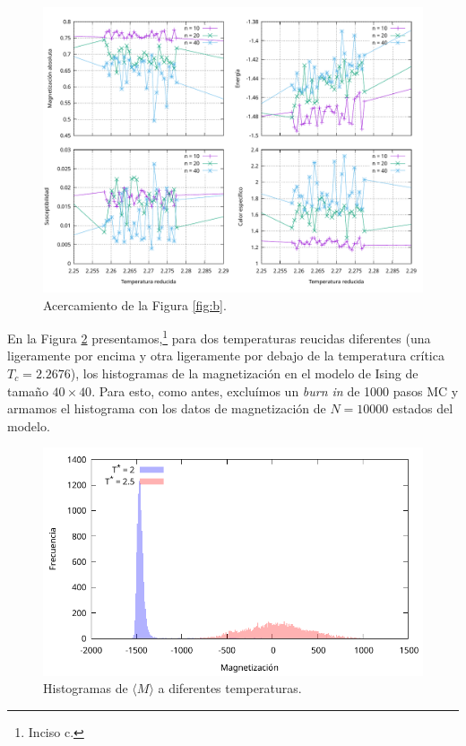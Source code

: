 \documentclass[a4paper,12pt]{article}
\begin{document}
\begin{figure}[h!]
    \centering
    \includegraphics[width = .9\textwidth]{../img/b_bis.pdf}
    \caption{Acercamiento de la Figura \ref{fig:b}.}
    \label{fig:b_bis}
\end{figure}

\newpage

En la Figura \ref{fig:c} presentamos,\footnote{Inciso c.} para dos temperaturas reucidas diferentes (una ligeramente por encima y otra ligeramente por debajo de la temperatura crítica $T_c = 2.2676$), los histogramas de la magnetización en el modelo de Ising de tamaño $40 \times 40$. Para esto, como antes, excluímos un {\it burn in} de 1000 pasos MC y armamos el histograma con los datos de magnetización de $N = 10000$ estados del modelo.

\begin{figure}[h!]
    \centering
    \includegraphics[width = .8\textwidth]{../img/c.pdf}
    \caption{Histogramas de $\langle M \rangle$ a diferentes temperaturas.}
    \label{fig:c}
\end{figure}
\end{document}
